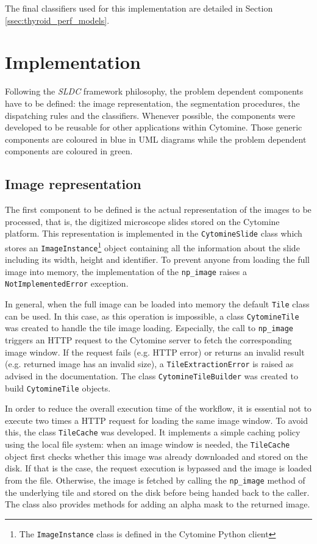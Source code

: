 The final classifiers used for this implementation are detailed in Section \ref{ssec:thyroid_perf_models}.

\section{Implementation}
\label{sec:thyroid_implementation}
Following the \textit{SLDC} framework philosophy, the problem dependent components have to be defined: the image representation, the segmentation procedures, the dispatching rules and the classifiers. Whenever possible, the components were developed to be reusable for other applications within Cytomine. Those generic components are coloured in blue in UML diagrams while the problem dependent components are coloured in green.

\subsection{Image representation}

The first component to be defined is the actual representation of the images to be processed, that is, the digitized microscope slides stored on the Cytomine platform. This representation is implemented in the \texttt{CytomineSlide} class which stores an \texttt{ImageInstance}\footnote{The \texttt{ImageInstance} class is defined in the Cytomine Python client} object containing all the information about the slide including its width, height and identifier. To prevent anyone from loading the full image into memory, the implementation of the \texttt{np\_image} raises a \texttt{NotImplementedError} exception. 

In general, when the full image can be loaded into memory the default \texttt{Tile} class can be used. In this case, as this operation is impossible, a class \texttt{CytomineTile} was created to handle the tile image loading. Especially, the call to \texttt{np\_image} triggers an HTTP request to the Cytomine server to fetch the corresponding image window. If the request fails (e.g. HTTP error) or returns an invalid result (e.g. returned image has an invalid size), a \texttt{TileExtractionError} is raised as advised in the documentation. The class \texttt{CytomineTileBuilder} was created to build \texttt{CytomineTile} objects.

In order to reduce the overall execution time of the workflow, it is essential not to execute two times a HTTP request for loading the same image window. To avoid this, the class \texttt{TileCache} was developed. It implements a simple caching policy using the local file system: when an image window is needed, the \texttt{TileCache} object first checks whether this image was already downloaded and stored on the disk. If that is the case, the request execution is bypassed and the image is loaded from the file. Otherwise, the image is fetched by calling the \texttt{np\_image} method of the underlying tile and stored on the disk before being handed back to the caller. The class also provides methods for adding an alpha mask to the returned image. 

